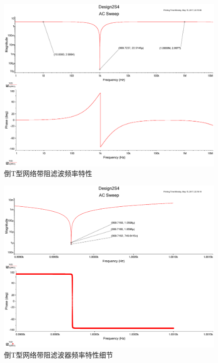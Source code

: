 \documentclass[UTF8,a4paper]{paper}
\begin{document}
\begin{multicols}{2}
\begin{figure}[H]
\centering
\includegraphics[width=\columnwidth]{2Sinf.pdf}
\caption{倒T型网络带阻滤波频率特性}
\label{SQ}
\end{figure}
\begin{figure}[H]
\centering
\includegraphics[width=\columnwidth]{2Sinf_1.pdf}
\caption{倒T型网络带阻滤波器频率特性细节}
\label{SQ1}
\end{figure}
\end{multicols}
\end{document}
